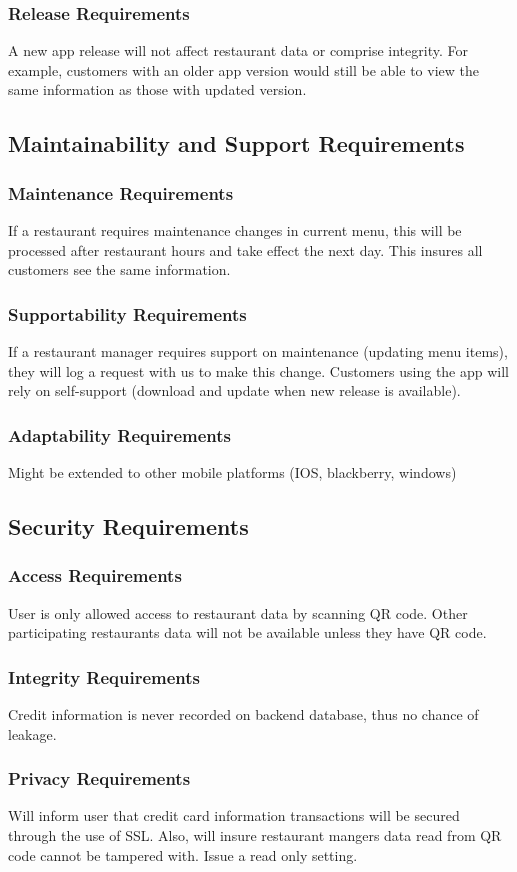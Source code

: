 \documentclass[12pt, titlepage]{article}
\begin{document}
\subsubsection{Release Requirements}
A new app release will not affect restaurant data or comprise integrity. For example, customers with an older app version would still be able to view the same information as those with updated version. 
\subsection{Maintainability and Support Requirements}
\subsubsection{Maintenance Requirements}
If a restaurant requires maintenance changes in current menu, this will be processed after restaurant hours and take effect the next day. This insures all customers see the same information. 
\subsubsection{Supportability Requirements}
If a restaurant manager requires support on maintenance (updating menu items), they will log a request with us to make this change. Customers using the app will rely on self-support (download and update when new release is available).
\subsubsection{Adaptability Requirements}
Might be extended to other mobile platforms (IOS, blackberry, windows) 
\subsection{Security Requirements}
\subsubsection{Access Requirements}
User is only allowed access to restaurant data by scanning QR code. Other participating restaurants data will not be available unless they have QR code. 
\subsubsection{Integrity Requirements}
Credit information is never recorded on backend database, thus no chance of leakage.
\subsubsection{Privacy Requirements}
Will inform user that credit card information transactions will be secured through the use of SSL. Also, will insure restaurant mangers data read from QR code cannot be tampered with. Issue a read only setting. 
\end{document}
